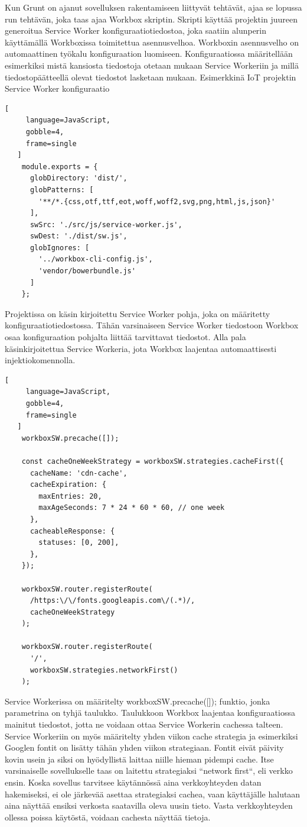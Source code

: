 \documentclass{tktltiki}
\begin{document}
Kun Grunt on ajanut sovelluksen rakentamiseen liittyvät tehtävät, ajaa se lopussa run tehtävän, joka taas ajaa Workbox skriptin. Skripti käyttää projektin juureen generoitua Service Worker konfiguraatiotiedostoa, joka saatiin alunperin käyttämällä Workboxissa toimitettua asennusvelhoa. Workboxin asennusvelho on automaattinen työkalu konfiguraation luomiseen. Konfiguraatiossa määritellään esimerkiksi mistä kansiosta tiedostoja otetaan mukaan Service Workeriin ja millä tiedostopäätteellä olevat tiedostot lasketaan mukaan. Esimerkkinä IoT projektin Service Worker konfiguraatio

\begin{lstlisting}[
     language=JavaScript,
     gobble=4,
     frame=single
   ]
    module.exports = {
      globDirectory: 'dist/',
      globPatterns: [
        '**/*.{css,otf,ttf,eot,woff,woff2,svg,png,html,js,json}'
      ],
      swSrc: './src/js/service-worker.js',
      swDest: './dist/sw.js',
      globIgnores: [
        '../workbox-cli-config.js',
        'vendor/bowerbundle.js'
      ]
    };
\end{lstlisting}


Projektissa on käsin kirjoitettu Service Worker pohja, joka on määritetty konfiguraatiotiedostossa. Tähän varsinaiseen Service Worker tiedostoon Workbox osaa konfiguraation pohjalta liittää tarvittavat tiedostot. Alla pala käsinkirjoitettua Service Workeria, jota Workbox laajentaa automaattisesti injektiokomennolla.

\begin{lstlisting}[
     language=JavaScript,
     gobble=4,
     frame=single
   ]
    workboxSW.precache([]);
    
    const cacheOneWeekStrategy = workboxSW.strategies.cacheFirst({
      cacheName: 'cdn-cache',
      cacheExpiration: {
        maxEntries: 20,
        maxAgeSeconds: 7 * 24 * 60 * 60, // one week
      },
      cacheableResponse: {
        statuses: [0, 200],
      },
    });
    
    workboxSW.router.registerRoute(
      /https:\/\/fonts.googleapis.com\/(.*)/,
      cacheOneWeekStrategy
    );
    
    workboxSW.router.registerRoute(
      '/',
      workboxSW.strategies.networkFirst()
    );
\end{lstlisting}

Service Workerissa on määritelty workboxSW.precache([]); funktio, jonka parametrina on tyhjä taulukko. Taulukkoon Workbox laajentaa konfiguraatiossa mainitut tiedostot, jotta ne voidaan ottaa Service Workerin cachessa talteen. Service Workeriin on myös määritelty yhden viikon cache strategia ja esimerkiksi Googlen fontit on lisätty tähän yhden viikon strategiaan. Fontit eivät päivity kovin usein ja siksi on hyödyllistä laittaa niille hieman pidempi cache. Itse varsinaiselle sovellukselle taas on laitettu strategiaksi “network first“, eli verkko ensin. Koska sovellus tarvitsee käytännössä aina verkkoyhteyden datan hakemiseksi, ei ole järkevää asettaa strategiaksi cachea, vaan käyttäjälle halutaan aina näyttää ensiksi verkosta saatavilla oleva uusin tieto. Vasta verkkoyhteyden ollessa poissa käytöstä, voidaan cachesta näyttää tietoja. 
\end{document}
